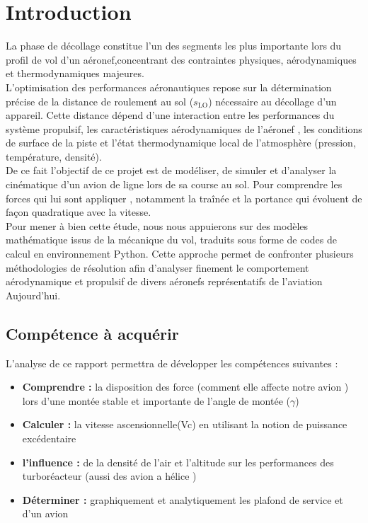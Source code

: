 


\chapter{Introduction}

La phase de décollage constitue l'un des segments les plus importante lors du profil de vol d'un aéronef,concentrant des contraintes physiques, aérodynamiques et thermodynamiques majeures. \\

L'optimisation des performances aéronautiques repose sur la détermination précise de la distance de roulement au sol ($s_{\text{LO}}$) nécessaire au décollage d'un appareil. Cette distance dépend d'une interaction  entre les performances du système propulsif, les caractéristiques aérodynamiques de l'aéronef , les conditions de surface de la piste et l'état thermodynamique local de l'atmosphère (pression, température, densité). \\

De ce fait l'objectif de ce projet est de modéliser, de simuler et d'analyser la cinématique d'un avion de ligne lors de sa course au sol. Pour comprendre  les forces qui lui sont appliquer , notamment la traînée et la portance qui évoluent de façon quadratique avec la vitesse. \\

Pour mener à bien cette étude, nous nous appuierons sur des modèles mathématique  issus de la mécanique du vol, traduits sous forme de codes de calcul en environnement Python. Cette approche permet de confronter plusieurs méthodologies de résolution afin d'analyser finement le comportement aérodynamique et propulsif de divers aéronefs représentatifs de l'aviation Aujourd'hui.


\vspace{1cm}
%



\section{Compétence à acquérir}
L'analyse de ce rapport permettra de développer les compétences suivantes :
\begin{itemize}[itemsep=0pt]
	\item \textbf{Comprendre :} la disposition des force (comment elle affecte notre avion ) lors d'une montée stable et importante de l'angle de montée ($\gamma$)
	\item \textbf{Calculer  :} la vitesse ascensionnelle(Vc) en utilisant la notion de puissance excédentaire
	\item \textbf{l'influence :} de la densité de l'air et l'altitude sur les performances des turboréacteur (aussi des avion a hélice )
	\item \textbf{Déterminer  :} graphiquement et analytiquement les plafond de service et d'un avion
\end{itemize}


